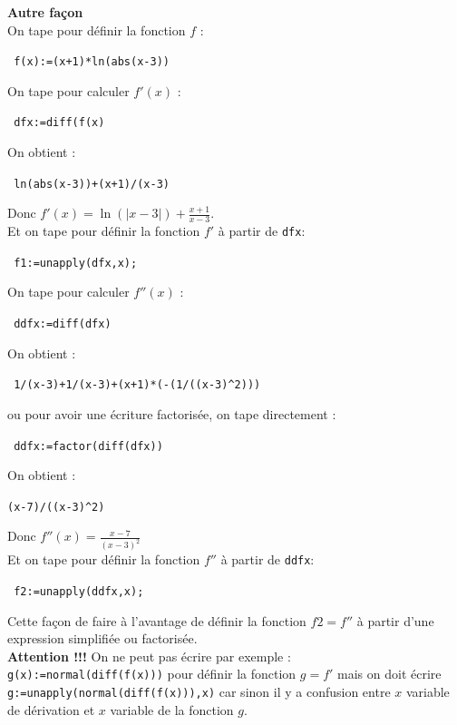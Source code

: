\documentclass{article}
\begin{document}
\begin{giacjshere}
\begin{enumerate}
{\bf Autre fa\c{c}on}\\
On tape pour d\'efinir la fonction $f$ :
\begin{center}
\verb| f(x):=(x+1)*ln(abs(x-3))|
\end{center}
On tape pour calculer $f'(x)$ :
\begin{center}
\verb| dfx:=diff(f(x)|
\end{center}
On obtient :
\begin{center}
\verb| ln(abs(x-3))+(x+1)/(x-3)|
\end{center}
Donc $\displaystyle f'(x)=\ln(|x-3|)+\frac{x+1}{x-3}$.\\
Et on tape pour d\'efinir la fonction $f'$ \`a partir de {\tt dfx}:
\begin{center}
\verb| f1:=unapply(dfx,x);|
\end{center}
On tape  pour calculer $f''(x)$ :
\begin{center}
\verb| ddfx:=diff(dfx)|
\end{center}
On obtient :
\begin{center}
\verb| 1/(x-3)+1/(x-3)+(x+1)*(-(1/((x-3)^2)))|
\end{center}
ou pour avoir une \'ecriture factoris\'ee, on tape directement :
\begin{center}
\verb| ddfx:=factor(diff(dfx))|
\end{center}
On obtient :
\begin{center}
\verb|(x-7)/((x-3)^2)|
\end{center}
Donc $\displaystyle f''(x)= \frac{x-7}{(x-3)^2}$\\
Et on tape pour d\'efinir la fonction $f''$ \`a partir de {\tt ddfx}:
\begin{center}
\verb| f2:=unapply(ddfx,x);|
\end{center}
Cette fa\c{c}on de faire \`a l'avantage de d\'efinir la fonction $f2=f''$ \`a 
partir d'une expression simplifi\'ee ou factoris\'ee.\\
{\bf Attention !!!} On ne peut pas \'ecrire par exemple :\\
{\tt g(x):=normal(diff(f(x)))} pour d\'efinir la fonction $g=f'$ mais on doit 
\'ecrire {\tt g:=unapply(normal(diff(f(x))),x)} car sinon il y a confusion 
entre $x$ variable de d\'erivation et $x$ variable de la fonction $g$.
 


\end{enumerate}
\end{giacjshere}
\end{document}

